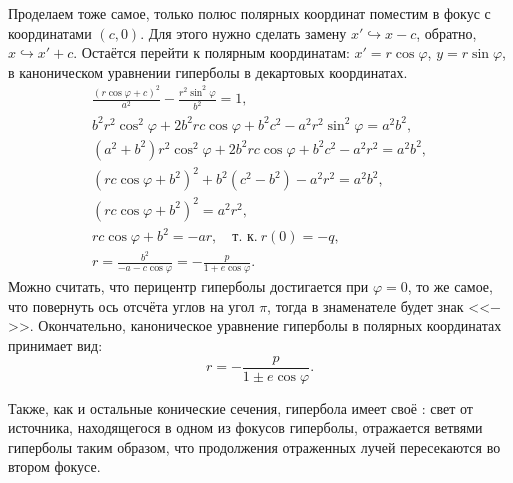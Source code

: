 Проделаем тоже самое, только полюс полярных координат поместим в фокус с координатами $(c,0)$. Для этого нужно сделать замену $x' \hookrightarrow x - c$, обратно, $x \hookrightarrow x' + c$. Остаётся перейти к полярным координатам: $x' = r \cos \varphi$, $y = r \sin \varphi$, в каноническом уравнении гиперболы в декартовых координатах.
\begin{gather*}
	\frac{(r \cos \varphi + c)^2}{a^2} - \frac{r^2 \sin^2 \varphi}{b^2} = 1,\\
	 b^2 r^2 \cos^2 \varphi + 2 b^2 r c \cos \varphi + b^2 c^2 - a^2 r^2 \sin^2 \varphi = a^2 b^2,\\
	 (a^2 + b^2) r^2 \cos^2 \varphi + 2 b^2 r c \cos \varphi + b^2 c^2 - a^2 r^2 = a^2 b^2,\\
	(rc\cos \varphi + b^2)^2 + b^2(c^2 - b^2) - a^2 r^2 = a^2 b^2,\\
	(rc\cos \varphi + b^2)^2 = a^2 r^2,\\
	rc\cos \varphi + b^2 = -a r,\quad\text{т. к.}~r(0) = -q,\\
	r = \frac{b^2}{-a - c \cos \varphi} = - \frac{p}{1 + e \cos \varphi}.
\end{gather*}
Можно считать, что перицентр гиперболы достигается при $\varphi = 0$, то же самое, что повернуть ось отсчёта углов на угол $\pi$, тогда в знаменателе будет знак <<$-$>>. Окончательно, каноническое уравнение гиперболы в полярных координатах принимает вид:
\begin{equation}
	r = -\frac{p}{1 \pm e \cos \varphi}.
\end{equation}

Также, как и остальные конические сечения, гипербола имеет своё : свет от источника, находящегося в одном из фокусов гиперболы, отражается ветвями гиперболы таким образом, что продолжения отраженных лучей пересекаются во втором фокусе.

